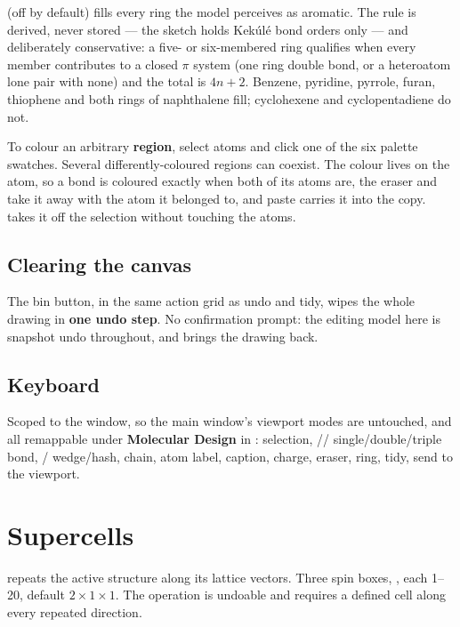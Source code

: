  (off by default) fills every ring the model perceives as
aromatic. The rule is derived, never stored --- the sketch holds Kek\'ul\'e
bond orders only --- and deliberately conservative: a five- or six-membered
ring qualifies when every member contributes to a closed $\pi$ system (one
ring double bond, or a heteroatom lone pair with none) and the total is
$4n+2$. Benzene, pyridine, pyrrole, furan, thiophene and both rings of
naphthalene fill; cyclohexene and cyclopentadiene do not.

To colour an arbitrary \textbf{region}, select atoms and click one of the six
palette swatches. Several differently-coloured regions can coexist. The
colour lives on the atom, so a bond is coloured exactly when both of its
atoms are, the eraser and  take it away with the atom it belonged
to, and paste carries it into the copy.  takes it off
the selection without touching the atoms.

\subsection{Clearing the canvas}

The bin button, in the same action grid as undo and tidy, wipes the whole
drawing in \textbf{one undo step}. No confirmation prompt: the editing model
here is snapshot undo throughout, and  brings the drawing back.

\subsection{Keyboard}

Scoped to the window, so the main window's viewport modes are untouched, and
all remappable under \textbf{Molecular Design} in
\menusep{}\menusep{}:
 selection, // single/double/triple bond,
/ wedge/hash,  chain,  atom label,
 caption,  charge,  eraser,  ring,
 tidy,  send to the viewport.

\section{Supercells}

\menusep{}\menusep{} repeats
the active structure along its lattice vectors. Three spin boxes,
, each 1--20, default $2 \times 1 \times 1$. The
operation is undoable and requires a defined cell along every repeated
direction.

